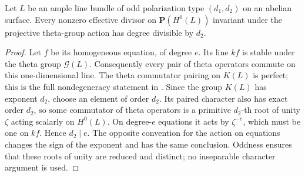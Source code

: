 \begin{lemma}
\label{lem:DE-theta-invariant-divisor-degree}
Let \(L\) be an ample line bundle of odd polarization type
\((d_1,d_2)\) on an abelian surface. Every nonzero effective
divisor on \(\mathbf P(H^0(L))\) invariant under the projective
theta-group action has degree divisible by \(d_2\).
\end{lemma}
\begin{proof}
Let \(f\) be its homogeneous equation, of degree \(e\).
Its line \(kf\) is stable under the theta group \(\mathcal G(L)\).
Consequently every pair of theta operators commute on this
one-dimensional line. The theta commutator pairing on \(K(L)\)
is perfect; this is the full nondegeneracy statement in
\citep[Proposition~8.19 and Corollary~8.20, p.~119]
{EdixhovenVanDerGeerMoonenAV}.
Since the group \(K(L)\) has exponent \(d_2\), choose an
element of order \(d_2\). Its paired character also has exact
order \(d_2\), so some commutator of theta operators is a
primitive \(d_2\)-th root of unity \(\zeta\) acting scalarly
on \(H^0(L)\). On degree-\(e\) equations it acts by
\(\zeta^{-e}\), which must be one on \(kf\). Hence
\(d_2\mid e\). The opposite convention for the action on
equations changes the sign of the exponent and has the same
conclusion. Oddness ensures that these roots of unity are
reduced and distinct; no inseparable character argument is used.
\end{proof}

